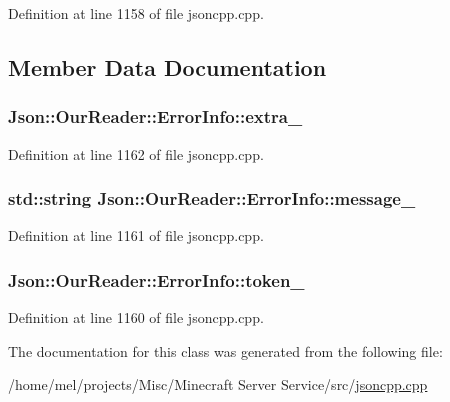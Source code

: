 Definition at line 1158 of file jsoncpp.\+cpp.



\subsection{Member Data Documentation}
\subsubsection[{\texorpdfstring{extra\+\_\+}{extra_}}]{ Json\+::\+Our\+Reader\+::\+Error\+Info\+::extra\+\_\+}\hypertarget{class_json_1_1_our_reader_1_1_error_info_a77ba2d32a471c7b9bc14621b76a5bdab}{}\label{class_json_1_1_our_reader_1_1_error_info_a77ba2d32a471c7b9bc14621b76a5bdab}


Definition at line 1162 of file jsoncpp.\+cpp.

\subsubsection[{\texorpdfstring{message\+\_\+}{message_}}]{\setlength{\rightskip}{0pt plus 5cm}std\+::string Json\+::\+Our\+Reader\+::\+Error\+Info\+::message\+\_\+}\hypertarget{class_json_1_1_our_reader_1_1_error_info_a9c973ff4d2c47134b770027d5d37d906}{}\label{class_json_1_1_our_reader_1_1_error_info_a9c973ff4d2c47134b770027d5d37d906}


Definition at line 1161 of file jsoncpp.\+cpp.

\subsubsection[{\texorpdfstring{token\+\_\+}{token_}}]{ Json\+::\+Our\+Reader\+::\+Error\+Info\+::token\+\_\+}\hypertarget{class_json_1_1_our_reader_1_1_error_info_ad05204ecabe5e7201a842935b874ae9a}{}\label{class_json_1_1_our_reader_1_1_error_info_ad05204ecabe5e7201a842935b874ae9a}


Definition at line 1160 of file jsoncpp.\+cpp.



The documentation for this class was generated from the following file\+:\begin{DoxyCompactItemize}
\item 
/home/mel/projects/\+Misc/\+Minecraft Server Service/src/\hyperlink{jsoncpp_8cpp}{jsoncpp.\+cpp}\end{DoxyCompactItemize}
